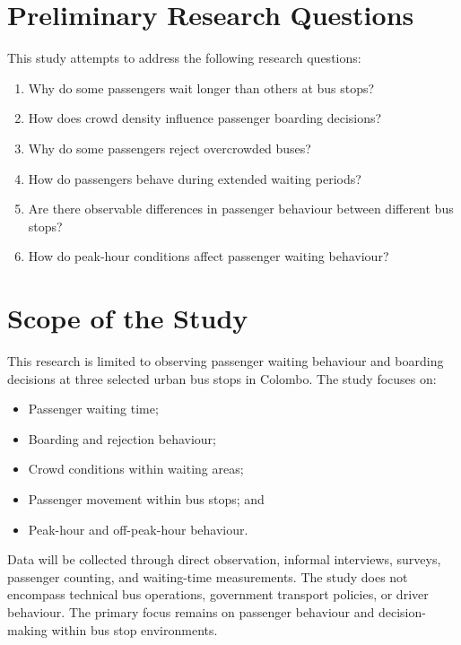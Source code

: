 \documentclass[12pt, a4paper]{report}
\begin{document}
\section{Preliminary Research Questions}

This study attempts to address the following research questions:

\begin{enumerate}[noitemsep]
    \item Why do some passengers wait longer than others at bus stops?
    \item How does crowd density influence passenger boarding decisions?
    \item Why do some passengers reject overcrowded buses?
    \item How do passengers behave during extended waiting periods?
    \item Are there observable differences in passenger behaviour between different bus stops?
    \item How do peak-hour conditions affect passenger waiting behaviour?
\end{enumerate}

\section{Scope of the Study}

This research is limited to observing passenger waiting behaviour and boarding decisions at
three selected urban bus stops in Colombo. The study focuses on:

\begin{itemize}[noitemsep]
    \item Passenger waiting time;
    \item Boarding and rejection behaviour;
    \item Crowd conditions within waiting areas;
    \item Passenger movement within bus stops; and
    \item Peak-hour and off-peak-hour behaviour.
\end{itemize}

Data will be collected through direct observation, informal interviews, surveys, passenger
counting, and waiting-time measurements. The study does not encompass technical bus
operations, government transport policies, or driver behaviour. The primary focus remains
on passenger behaviour and decision-making within bus stop environments.

\end{document}
